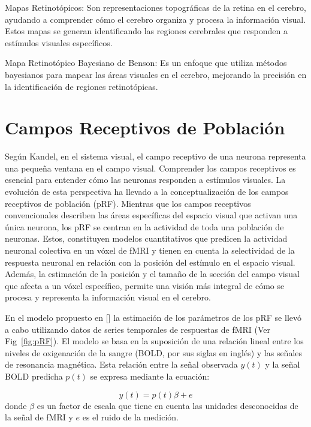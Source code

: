 Mapas Retinotópicos: Son representaciones topográficas de la retina en el cerebro, ayudando a comprender cómo el cerebro organiza y procesa la información visual. Estos mapas se generan identificando las regiones cerebrales que responden a estímulos visuales específicos.

Mapa Retinotópico Bayesiano de Benson: Es un enfoque que utiliza métodos bayesianos para mapear las áreas visuales en el cerebro, mejorando la precisión en la identificación de regiones retinotópicas.


\section{Campos Receptivos de Población}

Seg\'un Kandel, en el sistema visual, el campo receptivo de una neurona representa una pequeña ventana en el campo visual. Comprender los campos receptivos es esencial para entender cómo las neuronas responden a estímulos visuales. La evolución de esta perspectiva ha llevado a la conceptualización de los campos receptivos de población (pRF). Mientras que los campos receptivos convencionales describen las áreas específicas del espacio visual que activan una única neurona, los pRF se centran en la actividad de toda una población de neuronas. Estos, constituyen modelos cuantitativos que predicen la actividad neuronal colectiva en un vóxel de fMRI y tienen en cuenta la selectividad de la respuesta neuronal en relación con la posición del estímulo en el espacio visual. Adem\'as, la estimaci\'on de la posición y el tamaño de la sección del campo visual que afecta a un v\'oxel específico, permite una visión más integral de cómo se procesa y representa la información visual en el cerebro. 

En el modelo propuesto en [\cite{dumoulin_population_2008}] la estimación de los parámetros de los pRF se llevó a cabo utilizando datos de series temporales de respuestas de fMRI (Ver Fig~\ref{fig:pRF}). El modelo se basa en la suposición de una relación lineal entre los niveles de oxigenación de la sangre (BOLD, por sus siglas en inglés) y las señales de resonancia magnética. Esta relaci\'on entre la señal observada $y(t)$ y la señal BOLD predicha $p(t)$ se expresa mediante la ecuación:

\begin{equation}
	y(t)=p(t)\beta + e
\end{equation}
donde $\beta$ es un factor de escala que tiene en cuenta las unidades desconocidas de la señal de fMRI y $e$ es el ruido de la medición. 

